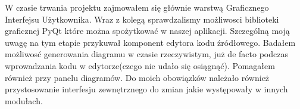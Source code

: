 W czasie trwania projektu zajmowałem się głównie warstwą Graficznego Interfejsu Użytkownika. Wraz z kolegą sprawdzalismy możliwosci biblioteki graficznej PyQt które można spożytkować w naszej aplikacji. Szczególną moją uwagę na tym etapie przykuwał komponent edytora kodu źródłowego. Badałem możliwosć generowania diagramu w czasie rzeczywistym, już de facto podczas wprowadzania kodu w edytorze(czego nie udało się osiągnąć). Pomagałem również przy panelu diagramów. Do moich obowiązków należało również przystosowanie interfesju zewnętrznego do zmian jakie występowały w innych modułach. 